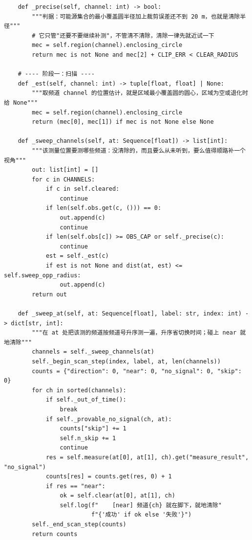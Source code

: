 \documentclass[UTF8, zihao=5,AutoFakeBold=2]{ctexart}
\begin{document}
\begin{lstlisting}
    def _precise(self, channel: int) -> bool:
        """判据：可能源集合的最小覆盖圆半径加上裁剪误差还不到 20 m，也就是清除半径"""
        # 它只管"还要不要继续补测"，不管清不清除，清除一律先就近试一下
        mec = self.region(channel).enclosing_circle
        return mec is not None and mec[2] + CLIP_ERR < CLEAR_RADIUS

    # ---- 阶段一：扫描 ----
    def _est(self, channel: int) -> tuple[float, float] | None:
        """取频道 channel 的位置估计，就是区域最小覆盖圆的圆心，区域为空或退化时给 None"""
        mec = self.region(channel).enclosing_circle
        return (mec[0], mec[1]) if mec is not None else None

    def _sweep_channels(self, at: Sequence[float]) -> list[int]:
        """该测量位置要测哪些频道：没清除的，而且要么从未听到，要么值得顺路补一个视角"""
        out: list[int] = []
        for c in CHANNELS:
            if c in self.cleared:
                continue
            if len(self.obs.get(c, ())) == 0:
                out.append(c)
                continue
            if len(self.obs[c]) >= OBS_CAP or self._precise(c):
                continue
            est = self._est(c)
            if est is not None and dist(at, est) <= self.sweep_opp_radius:
                out.append(c)
        return out

    def _sweep_at(self, at: Sequence[float], label: str, index: int) -> dict[str, int]:
        """在 at 处把该测的频道按频道号升序测一遍，升序省切换时间；碰上 near 就地清除"""
        channels = self._sweep_channels(at)
        self._begin_scan_step(index, label, at, len(channels))
        counts = {"direction": 0, "near": 0, "no_signal": 0, "skip": 0}
        for ch in sorted(channels):
            if self._out_of_time():
                break
            if self._provable_no_signal(ch, at):
                counts["skip"] += 1
                self.n_skip += 1
                continue
            res = self.measure(at[0], at[1], ch).get("measure_result", "no_signal")
            counts[res] = counts.get(res, 0) + 1
            if res == "near":
                ok = self.clear(at[0], at[1], ch)
                self.log(f"    [near] 频道{ch} 就在脚下，就地清除"
                         f"{'成功' if ok else '失败'}")
        self._end_scan_step(counts)
        return counts


\end{lstlisting}
\end{document}
